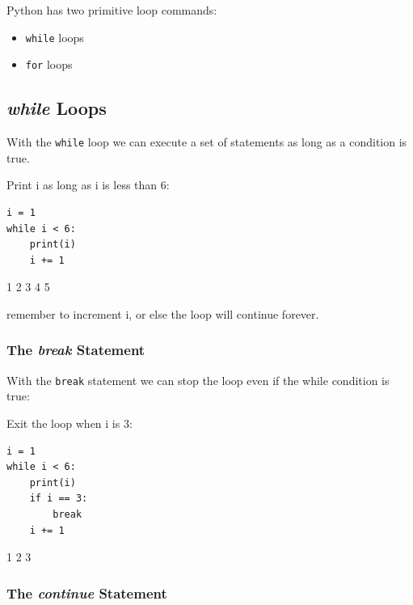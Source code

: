 \documentclass[12pt,a4paper]{article}
\newcommand{\code}[1]{%
	\colorbox{backcolour}{\lstinline{#1}}%
}
\begin{document}
Python has two primitive loop commands:

\begin{itemize}
	\item \code{while} loops
	\item \code{for} loops
\end{itemize}

\subsection{\textit{while} Loops}\label{pyWhileLoop}

With the \code{while} loop we can execute a set of statements as long as a
condition is true.

\begin{ebox}
Print i as long as i is less than 6:
	\begin{lstlisting}
i = 1
while i < 6:
    print(i)
    i += 1
	\end{lstlisting}
\tcblower
	\begin{vercode}
1
2
3
4
5
	\end{vercode}
\end{ebox}

\begin{nbox}
remember to increment i, or else the loop will continue forever.
\end{nbox}

\vfill\newpage
\subsubsection{The \textit{break} Statement}

With the \code{break} statement we can stop the loop even if the while
condition is true:

\begin{ebox}
Exit the loop when i is 3:
	\begin{lstlisting}
i = 1
while i < 6:
    print(i)
    if i == 3:
        break
    i += 1
	\end{lstlisting}
\tcblower
	\begin{vercode}
1
2
3
	\end{vercode}
\end{ebox}
\subsubsection{The \textit{continue} Statement}
\end{document}
